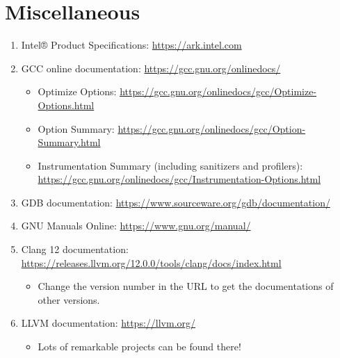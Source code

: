 \documentclass{article}
\begin{document}
\section{Miscellaneous}
\begin{enumerate}
    \item Intel® Product Specifications:
    \href{https://ark.intel.com}{https://ark.intel.com}
    \item GCC online documentation:
    \href{https://gcc.gnu.org/onlinedocs/}{https://gcc.gnu.org/onlinedocs/}
    \begin{itemize}
        \item Optimize Options:
        \href{https://gcc.gnu.org/onlinedocs/gcc/Optimize-Options.html}{https://gcc.gnu.org/onlinedocs/gcc/Optimize-Options.html}
        \item Option Summary:
        \href{https://gcc.gnu.org/onlinedocs/gcc/Option-Summary.html}{https://gcc.gnu.org/onlinedocs/gcc/Option-Summary.html}
        \item Instrumentation Summary (including sanitizers and profilers):\\
        \href{https://gcc.gnu.org/onlinedocs/gcc/Instrumentation-Options.html}{https://gcc.gnu.org/onlinedocs/gcc/Instrumentation-Options.html}
    \end{itemize}
    \item GDB documentation:
    \href{https://www.sourceware.org/gdb/documentation/}{https://www.sourceware.org/gdb/documentation/}
    \item GNU Manuals Online:
    \href{https://www.gnu.org/manual/}{https://www.gnu.org/manual/}
    \item Clang 12 documentation:
    \href{https://releases.llvm.org/12.0.0/tools/clang/docs/index.html}{https://releases.llvm.org/12.0.0/tools/clang/docs/index.html}
    \begin{itemize}
        \item Change the version number in the URL to get the documentations of other versions.
    \end{itemize}
    \item LLVM documentation:
    \href{https://llvm.org/}{https://llvm.org/}
    \begin{itemize}
        \item Lots of remarkable projects can be found there!
    \end{itemize}
\end{enumerate}



\end{document}
